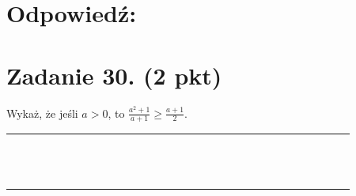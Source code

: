 \documentclass[10pt]{article}
\begin{document}
\section*{Odpowiedź:}
\section*{Zadanie 30. (2 pkt)}
Wykaż, że jeśli \(a>0\), to \(\frac{a^{2}+1}{a+1} \geq \frac{a+1}{2}\).

\begin{center}
\begin{tabular}{|c|c|c|c|c|c|c|c|c|c|c|c|c|c|c|c|c|c|c|c|c|c|c|c|c|c|c|c|c|c|c|}
\hline
 &  &  &  &  &  &  &  &  &  &  &  &  &  &  &  &  &  &  &  &  &  &  &  &  &  &  &  &  &  &  \\
\hline
 &  &  &  &  &  &  &  &  &  &  &  &  &  &  &  &  &  &  &  &  &  &  &  &  &  &  &  &  &  &  \\
\hline
 &  &  &  &  &  &  &  &  &  &  &  &  &  &  &  &  &  &  &  &  &  &  &  &  &  &  &  &  &  &  \\
\hline
 &  &  &  &  &  &  &  &  &  &  &  &  &  &  &  &  &  &  &  &  &  &  &  &  &  &  &  &  &  &  \\
\hline
 &  &  &  &  &  &  &  &  &  &  &  &  &  &  &  &  &  &  &  &  &  &  &  &  &  &  &  &  &  &  \\
\hline
 &  &  &  &  &  &  &  &  &  &  &  &  &  &  &  &  &  &  &  &  &  &  &  &  &  &  &  &  &  &  \\
\hline
 &  &  &  &  &  &  &  &  &  &  &  &  &  &  &  &  &  &  &  &  &  &  &  &  &  &  &  &  &  &  \\
\hline
 &  &  &  &  &  &  &  &  &  &  &  &  &  &  &  &  &  &  &  &  &  &  &  &  &  &  &  &  &  &  \\
\hline
 &  &  &  &  &  &  &  &  &  &  &  &  &  &  &  &  &  &  &  &  &  &  &  &  &  &  &  &  &  &  \\
\hline
 &  &  &  &  &  &  &  &  &  &  &  &  &  &  &  &  &  &  &  &  &  &  &  &  &  &  &  &  &  &  \\
\hline
 &  &  &  &  &  &  &  &  &  &  &  &  &  &  &  &  &  &  &  &  &  &  &  &  &  &  &  &  &  &  \\
\hline
 &  &  &  &  &  &  &  &  &  &  &  &  &  &  &  &  &  &  &  &  &  &  &  &  &  &  &  &  &  &  \\
\hline
 &  &  &  &  &  &  &  &  &  &  &  &  &  &  &  &  &  &  &  &  &  &  &  &  &  &  &  &  &  &  \\
\hline
 &  &  &  &  &  &  &  &  &  &  &  &  &  &  &  &  &  &  &  &  &  &  &  &  &  &  &  &  &  &  \\

\end{tabular}
\end{center}
\end{document}
